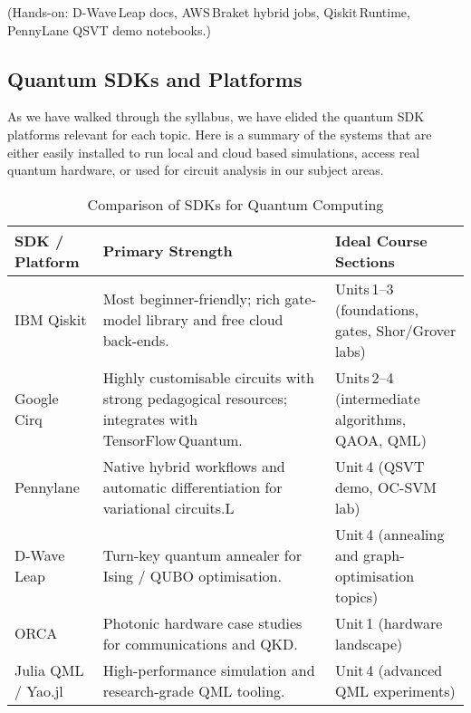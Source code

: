 (Hands-on: D-Wave Leap docs, AWS Braket hybrid jobs, Qiskit Runtime, PennyLane QSVT demo notebooks.)

\subsection{Quantum SDKs and Platforms}

As we have walked through the syllabus, we have elided the quantum SDK platforms relevant for each topic.
Here is a summary of the systems that are either easily installed to run local and cloud based simulations, 
access real quantum hardware, or used for circuit analysis in our subject areas.

\begin{table}[ht]
	\centering
	\begin{tabular}{|p{2.8cm}|p{7cm}|p{4cm}|}
		\hline
		\textbf{SDK / Platform} & \textbf{Primary Strength} & \textbf{Ideal Course Sections} \\
		\hline
		IBM Qiskit & Most beginner-friendly; rich gate-model library and free cloud back-ends. & Units 1–3 (foundations, gates, Shor/Grover labs) \\
		\hline
		Google Cirq & Highly customisable circuits with strong pedagogical resources; integrates with TensorFlow Quantum. & Units 2–4 (intermediate algorithms, QAOA, QML) \\
		\hline
		Pennylane & Native hybrid workflows and automatic differentiation for variational circuits.L & Unit 4 (QSVT demo, OC-SVM lab) \\
		\hline
		D-Wave Leap & Turn-key quantum annealer for Ising / QUBO optimisation. & Unit 4 (annealing and graph-optimisation topics) \\
		\hline
		ORCA  & Photonic hardware case studies for communications and QKD. & Unit 1 (hardware landscape) \\
		\hline
		Julia QML / Yao.jl & High-performance simulation and research-grade QML tooling. & Unit 4 (advanced QML experiments) \\
		\hline
	\end{tabular}
	\caption{Comparison of SDKs for Quantum Computing}
	\label{tab:quantum_sdk_comparison}
\end{table}
